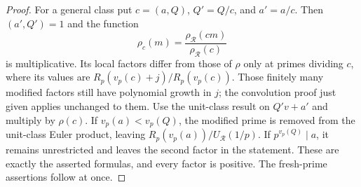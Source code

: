 \begin{proof}
For a general class put $c=(a,Q)$, $Q'=Q/c$, and $a'=a/c$.
Then $(a',Q')=1$ and the function
\[
 \rho_c(m)=\frac{\rho_{\mathcal R}(cm)}{\rho_{\mathcal R}(c)}
\]
is multiplicative. Its local factors differ from those of $\rho$ only
at primes dividing $c$, where its values are $R_p(v_p(c)+j)/R_p(v_p(c))$.
Those finitely many modified factors still have polynomial growth in $j$;
the convolution proof just given applies unchanged to them.
Use the unit-class result on $Q'v+a'$ and multiply by $\rho(c)$.
If $v_p(a)<v_p(Q)$, the modified prime is removed from the unit-class
Euler product, leaving $R_p(v_p(a))/U_{\mathcal R}(1/p)$.
If $p^{v_p(Q)}\mid a$, it remains unrestricted and leaves the second
factor in the statement. These are exactly the asserted formulas,
and every factor is positive. The fresh-prime assertions follow at once.
\end{proof}

